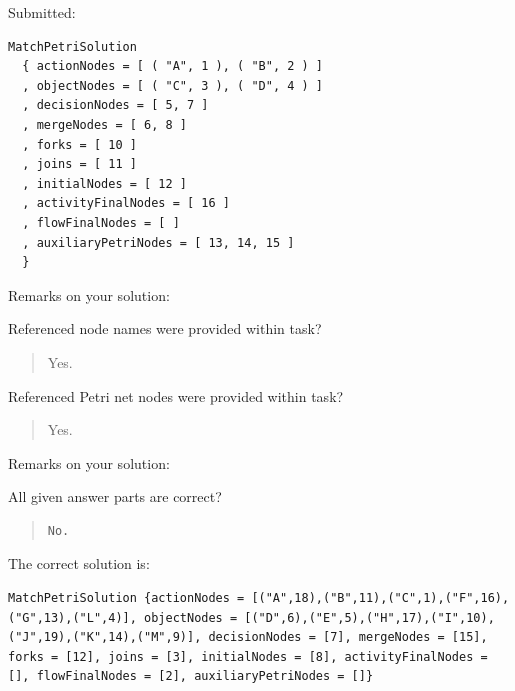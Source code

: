 Submitted:


\begin{verbatim}
MatchPetriSolution 
  { actionNodes = [ ( "A", 1 ), ( "B", 2 ) ]
  , objectNodes = [ ( "C", 3 ), ( "D", 4 ) ]
  , decisionNodes = [ 5, 7 ]
  , mergeNodes = [ 6, 8 ]
  , forks = [ 10 ]
  , joins = [ 11 ]
  , initialNodes = [ 12 ]
  , activityFinalNodes = [ 16 ]
  , flowFinalNodes = [ ]
  , auxiliaryPetriNodes = [ 13, 14, 15 ] 
  }
\end{verbatim}


Remarks on your solution:

Referenced node names were provided within task?\begin{quote}Yes.\end{quote}Referenced Petri net nodes were provided within task?\begin{quote}Yes.\end{quote}Remarks on your solution:

All given answer parts are correct?

\begin{quote}
\begin{verbatim}
No.
\end{verbatim}
\end{quote}

The correct solution is:
\begin{verbatim}
MatchPetriSolution {actionNodes = [("A",18),("B",11),("C",1),("F",16),("G",13),("L",4)], objectNodes = [("D",6),("E",5),("H",17),("I",10),("J",19),("K",14),("M",9)], decisionNodes = [7], mergeNodes = [15], forks = [12], joins = [3], initialNodes = [8], activityFinalNodes = [], flowFinalNodes = [2], auxiliaryPetriNodes = []}
\end{verbatim}


